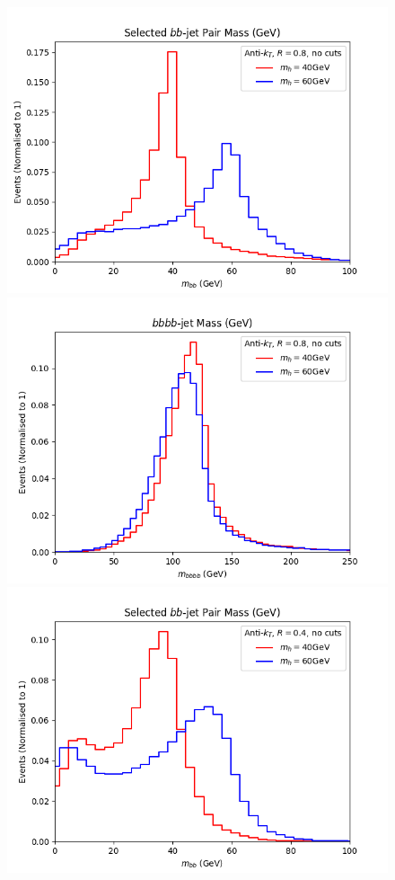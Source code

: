 \documentclass[12pt]{article}
\begin{document}
%
%
\begin{figure}[t!]
	\includegraphics[scale=0.5]{plots/bbmass_AK8_nocuts.png}
	\includegraphics[scale=0.5]{plots/bbbbmass_AK8_nocuts.png}
	\includegraphics[scale=0.5]{plots/bbmass_AK4_nocuts.png}

\end{figure}
\end{document}

